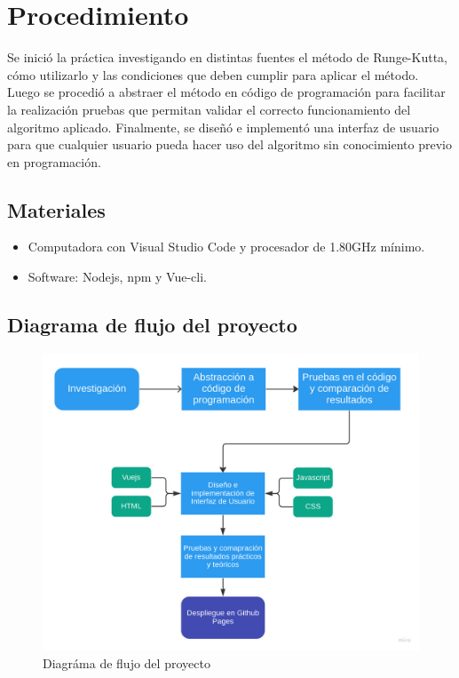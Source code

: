 \documentclass[article, 11pt]{IEEEtran}   %
\begin{document}
\section{Procedimiento}
Se inició la práctica investigando en distintas fuentes el método de Runge-Kutta, cómo utilizarlo y las condiciones que deben cumplir para aplicar el método. Luego se procedió a abstraer el método en código de programación para facilitar la realización pruebas que permitan validar el correcto funcionamiento del algoritmo aplicado. Finalmente, se diseñó e implementó una interfaz de usuario para que cualquier usuario pueda hacer uso del algoritmo sin conocimiento previo en programación.

\subsection{Materiales}
\begin{itemize}       							%
\item Computadora con Visual Studio Code y procesador de 1.80GHz mínimo.
\item Software: Nodejs, npm y Vue-cli.
\end{itemize}

\subsection{Diagrama de flujo del proyecto}

\begin{figure}[H]									%
\centering
\includegraphics[scale=0.2]{flujoDeProyecto}%
\caption{Diagráma de flujo del proyecto}\label{diagram1}  %
\end{figure}
\end{document}

